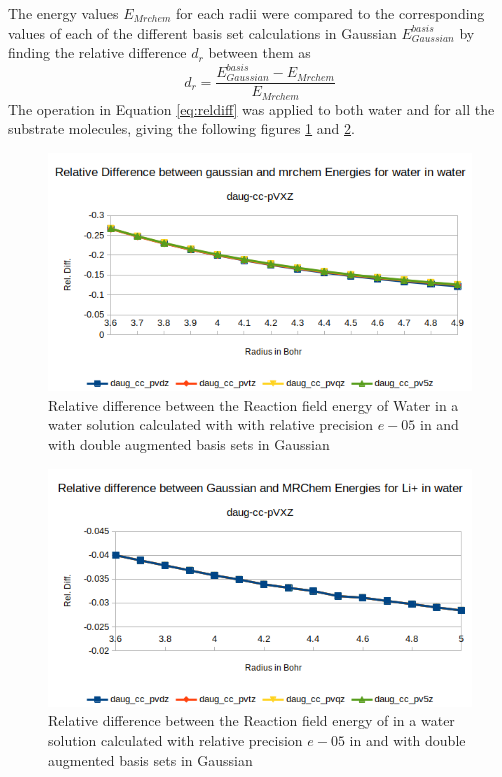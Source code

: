 \documentclass[../master_thesis.tex]{subfiles}
\begin{document}
The \mrchem energy values $E_{Mrchem}$ for each radii were compared to the
corresponding values of each of the different basis set calculations in
Gaussian  $E_{Gaussian}^{basis}$ by finding the relative difference $d_r$
between them as
\begin{equation}\label{eq:reldiff}
  d_r = \frac{E_{Gaussian}^{basis} - E_{Mrchem}}{E_{Mrchem}}
\end{equation}
The operation in Equation \ref{eq:reldiff} was applied to both water and  for all the
substrate molecules, giving the following figures \ref{fig:watreldiffdaug} and \ref{fig:lipreldiffdaug}.


\begin{figure}[h!]
  \centering
    \includegraphics[width=\linewidth]{img/watdaugreldiff.png}
  \caption{Relative difference between the Reaction field energy of Water in a water solution calculated with with relative precision $e-05$ in \mrchem
   and with double augmented basis sets in Gaussian}
  \label{fig:watreldiffdaug}
\end{figure}

\begin{figure}[h!]
  \centering
  \includegraphics[width=\linewidth]{img/lipdaugreldiff.png}
  \caption{Relative difference between the Reaction field energy of in a water solution calculated with relative precision $e-05$ in \mrchem
  and with double augmented basis sets in Gaussian}
  \label{fig:lipreldiffdaug}
\end{figure}
\end{document}
